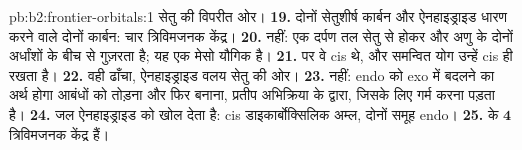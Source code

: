 \begin{solution}{pb:b2:frontier-orbitals:1}
 सेतु की विपरीत ओर।
\textbf{19.} दोनों सेतुशीर्ष कार्बन और ऐनहाइड्राइड धारण करने वाले दोनों कार्बन: चार
त्रिविमजनक केंद्र।
\textbf{20.} नहीं: एक दर्पण तल  सेतु से होकर और अणु के दोनों अर्धांशों के बीच से
गुज़रता है; यह एक मेसो यौगिक है।
\textbf{21.}  पर वे cis थे, और समन्वित योग उन्हें cis ही रखता है।
\textbf{22.} वही ढाँचा, ऐनहाइड्राइड वलय  सेतु की ओर।
\textbf{23.} नहीं: endo को exo में बदलने का अर्थ होगा  आबंधों को तोड़ना और फिर बनाना,
प्रतीप अभिक्रिया के द्वारा, जिसके लिए गर्म करना पड़ता है।
\textbf{24.} जल ऐनहाइड्राइड को खोल देता है: cis डाइकार्बोक्सिलिक अम्ल, दोनों  समूह endo।
\textbf{25.}  के $\boldsymbol{4}$ त्रिविमजनक केंद्र हैं।
\end{solution}
